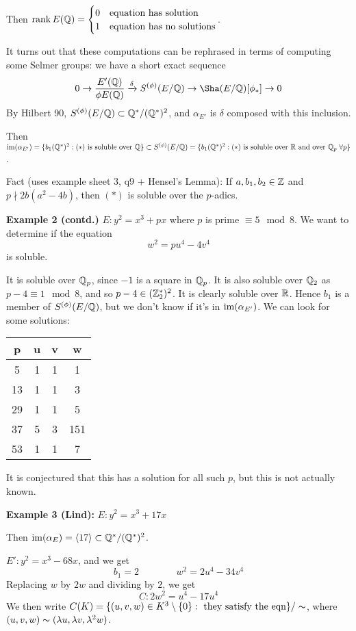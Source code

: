 \documentclass[10pt,a4paper]{article}
\begin{document}
Then $\operatorname{rank} E(\mathbb{Q}) = \begin{cases} 0 & \text{equation has solution} \\ 1 & \text{equation has no solutions} \end{cases}$.

It turns out that these computations can be rephrased in terms of computing some Selmer groups: we have a short exact sequence
\[0 \to \frac{E'(\Q)}{\phi E(\Q)} \xrightarrow{\delta} S^{(\phi)}(E/\Q) \to \Sha(E/\Q)[\phi_\ast] \to 0\]
By Hilbert 90, $S^{(\phi)}(E/\mathbb{Q}) \subset \mathbb{Q}^\ast/(\mathbb{Q}^\ast)^2$, and $\alpha_{E'}$ is $\delta$ composed with this inclusion.

Then $\Image(\alpha_{E'}) = \{b_1(\Q^\ast)^2 : (\ast)\text{ is soluble over }\Q\} \subset S^{(\phi)}(E/\Q) = \{b_1(\Q^\ast)^2: (\ast) \text{ is soluble over } \R\text{ and over }\Q_p \forall p\}$.

Fact (uses example sheet 3, q9 + Hensel's Lemma): If $a, b_1, b_2 \in \mathbb{Z}$ and $p\nmid 2b(a^2-4b)$, then $(\ast)$ is soluble over the $p$-adics.

\textbf{Example 2 (contd.)} $E: y^2 = x^3+px$ where $p$ is prime $\equiv 5 \mod 8$. We want to determine if the equation
\[w^2 = pu^4-4v^4\]
is soluble.

It is soluble over $\mathbb{Q}_p$, since $-1$ is a square in $\mathbb{Q}_p$. It is also soluble over $\mathbb{Q}_2$ as $p-4 \equiv 1 \mod 8$, and so $p-4 \in (\mathbb{Z}_2^\ast)^2$. It is clearly soluble over $\mathbb{R}$. Hence $b_1$ is a member of $S^{(\phi)}(E/\mathbb{Q})$, but we don't know if it's in $\operatorname{im}(\alpha_{E'})$. We can look for some solutions:

\begin{tabular}{c|ccc}
  p & u & v & w \\\hline
  5 & 1 & 1 & 1 \\
  13 & 1 & 1 & 3\\
  29 & 1 & 1 & 5\\
  37 & 5 & 3 & 151\\
  53 & 1 & 1 & 7
\end{tabular}

It is conjectured that this has a solution for all such $p$, but this is not actually known.

\textbf{Example 3 (Lind):} $E : y^2 = x^3 + 17x$

Then $\operatorname{im}(\alpha_E) = \langle 17 \rangle \subset \mathbb{Q}^\ast/(\mathbb{Q}^\ast)^2$.

$E' : y^2 = x^3-68x$, and we get
\[b_1 = 2\;\;\;\;\;\;\;\;\;\;\;\;\;\; w^2 = 2u^4-34v^4\]
Replacing $w$ by $2w$ and dividing by $2$, we get
\[C: 2w^2 = u^4-17u^4\]
We then write $C(K) = \{(u,v,w)\in K^3\setminus\{0\} : \text{ they satisfy the eqn}\}/\thicksim$, where $(u,v,w)\thicksim (\lambda u, \lambda v, \lambda^2 w)$.
\end{document}
